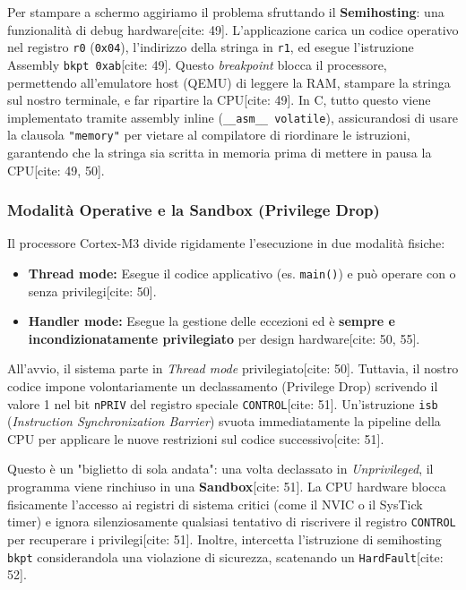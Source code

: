 Per stampare a schermo aggiriamo il problema sfruttando il \textbf{Semihosting}: una funzionalità di debug hardware[cite: 49]. L'applicazione carica un codice operativo nel registro \texttt{r0} (\texttt{0x04}), l'indirizzo della stringa in \texttt{r1}, ed esegue l'istruzione Assembly \texttt{bkpt 0xab}[cite: 49]. Questo \textit{breakpoint} blocca il processore, permettendo all'emulatore host (QEMU) di leggere la RAM, stampare la stringa sul nostro terminale, e far ripartire la CPU[cite: 49]. 
In C, tutto questo viene implementato tramite assembly inline (\texttt{\_\_asm\_\_ volatile}), assicurandosi di usare la clausola \texttt{"memory"} per vietare al compilatore di riordinare le istruzioni, garantendo che la stringa sia scritta in memoria prima di mettere in pausa la CPU[cite: 49, 50].

\subsubsection*{Modalità Operative e la Sandbox (Privilege Drop)}
Il processore Cortex-M3 divide rigidamente l'esecuzione in due modalità fisiche:
\begin{itemize}
    \item \textbf{Thread mode:} Esegue il codice applicativo (es. \texttt{main()}) e può operare con o senza privilegi[cite: 50].
    \item \textbf{Handler mode:} Esegue la gestione delle eccezioni ed è \textbf{sempre e incondizionatamente privilegiato} per design hardware[cite: 50, 55].
\end{itemize}

All'avvio, il sistema parte in \textit{Thread mode} privilegiato[cite: 50]. Tuttavia, il nostro codice impone volontariamente un declassamento (Privilege Drop) scrivendo il valore 1 nel bit \texttt{nPRIV} del registro speciale \texttt{CONTROL}[cite: 51]. Un'istruzione \texttt{isb} (\textit{Instruction Synchronization Barrier}) svuota immediatamente la pipeline della CPU per applicare le nuove restrizioni sul codice successivo[cite: 51].

Questo è un "biglietto di sola andata": una volta declassato in \textit{Unprivileged}, il programma viene rinchiuso in una \textbf{Sandbox}[cite: 51]. La CPU hardware blocca fisicamente l'accesso ai registri di sistema critici (come il NVIC o il SysTick timer) e ignora silenziosamente qualsiasi tentativo di riscrivere il registro \texttt{CONTROL} per recuperare i privilegi[cite: 51]. Inoltre, intercetta l'istruzione di semihosting \texttt{bkpt} considerandola una violazione di sicurezza, scatenando un \texttt{HardFault}[cite: 52].


